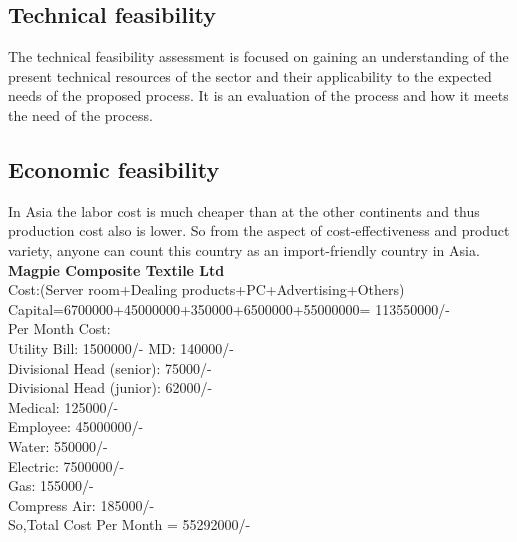 \documentclass{article}
\begin{document}
\subsection{Technical feasibility}
The technical feasibility assessment is focused on gaining an understanding of the present technical resources of the sector and their applicability to the expected needs of the proposed process. It is an evaluation of the process and how it meets the need of the process. 
\subsection{Economic feasibility}
In Asia the labor cost is much cheaper than at the other continents and thus production cost also is lower. So from the aspect of cost-effectiveness and product variety, anyone can count this country as an import-friendly country in Asia.\\
\textbf{Magpie Composite Textile Ltd}\\
Cost:(Server room+Dealing products+PC+Advertising+Others)\\
Capital=6700000+45000000+350000+6500000+55000000= 113550000/-
\\Per Month Cost:\\
Utility Bill: 1500000/-
MD: 140000/-\\
Divisional Head (senior): 75000/-\\
Divisional Head (junior): 62000/-\\
Medical: 125000/-\\
Employee: 45000000/-\\
Water: 550000/-\\
Electric: 7500000/-\\
Gas: 155000/-\\
Compress Air: 185000/-\\
So,Total Cost Per Month = 55292000/-\\
\end{document}
